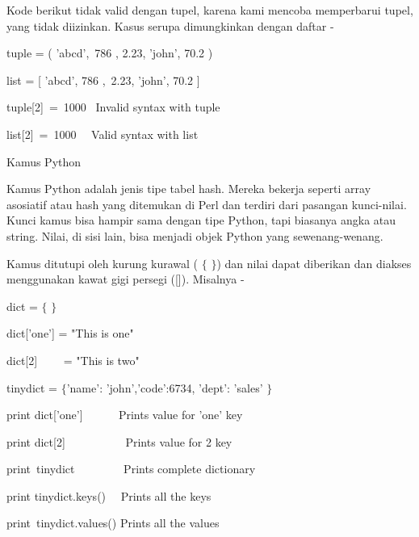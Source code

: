 \noindent 
Kode berikut tidak valid dengan tupel, karena kami mencoba memperbarui tupel, yang tidak diizinkan. $  $Kasus serupa dimungkinkan dengan daftar - \par
\vspace{12pt}
\noindent 
tuple = ( 'abcd',~786 , 2.23, 'john', 70.2  ) \par
\noindent 
list = [ 'abcd', 786 ,~2.23, 'john', 70.2  ] \par
\noindent 
tuple[2]~=~1000~    Invalid syntax with tuple \par
\noindent 
list[2]~=~1000~~    Valid syntax with list \par
\vspace{12pt}
\noindent 
Kamus Python \par
\vspace{12pt}
\noindent 
Kamus Python adalah jenis tipe tabel hash. $  $Mereka bekerja seperti array asosiatif atau hash yang ditemukan di Perl dan terdiri dari pasangan kunci-nilai. $  $Kunci kamus bisa hampir sama dengan tipe Python, tapi biasanya angka atau string. $  $Nilai, di sisi lain, bisa menjadi objek Python yang sewenang-wenang. \par
\vspace{12pt}
\noindent 
Kamus ditutupi oleh kurung kurawal ( $  \{  $ $  \}  $) dan nilai dapat diberikan dan diakses menggunakan kawat gigi persegi ([]). $  $Misalnya - \par
\vspace{12pt}
\vspace{12pt}
\noindent 
dict =  $  \{  $ $  \}  $ \par
\noindent 
dict['one'] = "This is one" \par
\noindent 
dict[2]~~~~ = "This is two" \par
\vspace{12pt}
\noindent 
tinydict =  $  \{  $'name': 'john','code':6734, 'dept': 'sales' $  \}  $ \par
\vspace{12pt}
\vspace{12pt}
\noindent 
print dict['one']~~ ~~~  Prints value for 'one' key \par
\noindent 
print dict[2]~~~~~~~~~~  Prints value for 2 key \par
\noindent 
print~tinydict~~~~~~~~   Prints complete dictionary \par
\noindent 
print tinydict.keys()~~  Prints all the keys \par
\noindent 
print~tinydict.values()   Prints all the values \par
